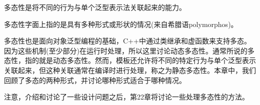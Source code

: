 多态性是将不同的行为与单个泛型表示法关联起来的能力。

\begin{tcolorbox}[colback=webgreen!5!white,colframe=webgreen!75!black]
\hspace*{0.75cm}多态性字面上指的是具有多种形式或形状的情况(来自希腊语polymorphos)。
\end{tcolorbox}

多态性也是面向对象泛型编程的基础，C++中通过类继承和虚函数来支持多态。因为这些机制(至少部分)在运行时处理，所以这里讨论动态多态性。通常所说的多态性，指的就是动态多态性。然而，模板还允许将不同的特定行为与单个泛型表示关联起来，但这种关联通常在编译时进行处理，称之为静态多态性。本章中，我们回顾了多态的两种形式，并讨论哪种形式适合于哪种情况。

注意，介绍和讨论了一些设计问题之后，第22章将讨论一些处理多态性的方法。